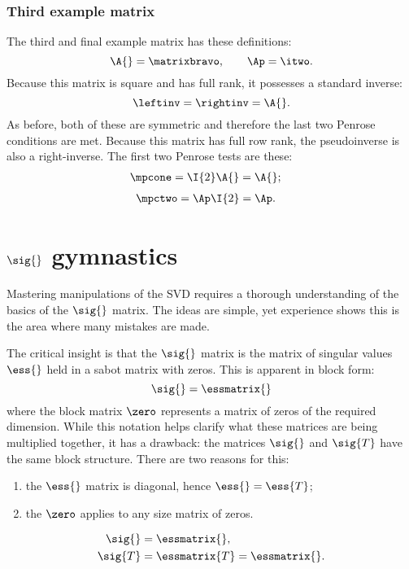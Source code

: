 \subsubsection{Third example matrix}
The third and final example matrix has these definitions:
\begin{equation}
  \A{} = \matrixbravo, \qquad \Ap = \itwo.
\end{equation}
Because this matrix is square and has full rank, it possesses a standard inverse:
\begin{equation}
  \leftinv = \rightinv = \A{}.
  \label{eq:mp:projectors:2}
\end{equation}
As before, both of these are symmetric and therefore the last two Penrose conditions are met. Because this matrix has full row rank, the pseudoinverse is also a right-inverse. The first two Penrose tests are these:
\begin{equation}
  \begin{split}
     \mpcone &= \I{2}\A{} = \A{};
  \end{split}
\end{equation}
\begin{equation}
  \begin{split}
     \mpctwo &= \Ap\I{2} = \Ap.
  \end{split}
\end{equation}

%
\section{$\sig{}$ gymnastics}
Mastering manipulations of the SVD requires a thorough understanding of the basics of the $\sig{}$ matrix. The ideas are simple, yet experience shows this is the area where many mistakes are made.

The critical insight is that the $\sig{}$ matrix is the matrix of singular values $\ess{}$ held in a sabot matrix with zeros. This is apparent in block form:
\begin{equation}
  \sig{} = \essmatrix{}
\end{equation}
where the block matrix $\zero$ represents a matrix of zeros of the required dimension. While this notation helps clarify what these matrices are being multiplied together, it has a drawback: the matrices $\sig{}$ and $\sig{T}$ have the same block structure. There are two reasons for this:
\begin{enumerate}
\item the $\ess{}$ matrix is diagonal, hence $\ess{}=\ess{T}$;
\item the $\zero$ applies to any size matrix of zeros.
\end{enumerate}
\begin{equation}
  \begin{split}
     \sig{} &= \essmatrix{},\\
     \sig{T}&= \essmatrix{T} = \essmatrix{}.
  \end{split}
\end{equation}

